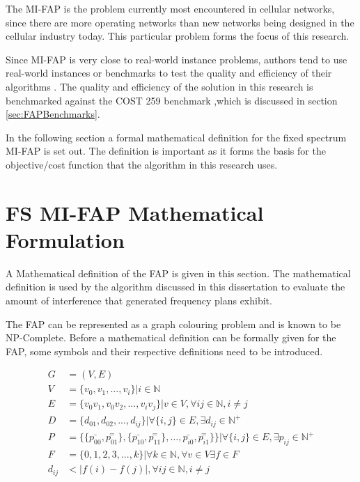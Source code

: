 The MI-FAP is the problem currently most encountered in cellular networks, since there are more operating networks than new networks being designed in the cellular industry today. This particular problem forms the focus of this research. 

Since MI-FAP is very close to real-world instance problems, authors tend to use real-world instances or benchmarks to test the quality and efficiency of their algorithms \cite{Eisenblatter,MontemanniThesis}. The quality and efficiency of the solution in this research is benchmarked against the COST 259 benchmark ,which is discussed in section \ref{sec:FAPBenchmarks}.

In the following section a formal mathematical definition for the fixed spectrum MI-FAP is set out. The definition is important as it forms the basis for the objective/cost function that the algorithm in this research uses.
 
\section{FS MI-FAP Mathematical Formulation}
\label{sec:FAPMathDef}
A Mathematical definition of the FAP is given in this section. The mathematical definition is used by the algorithm discussed in this dissertation to evaluate the amount of interference that generated frequency plans exhibit.

The FAP can be represented as a graph colouring problem and is known to be NP-Complete. Before a mathematical definition can be formally given for the FAP, some symbols and their respective definitions need to be introduced.

\begin{align}
	G &= (V,E) \label{E:setG}\\
	V &= \{v_{0},v_{1},...,v_{i}\} | i \in \mathbb{N} \label{E:setV}\\
	E &= \{v_0v_1,v_0v_2,...,v_iv_j\}|v \in V,\forall ij \in \mathbb{N},i \neq j \label{E:setE}\\
	D &= \{d_{01},d_{02},...,d_{ij}\}| \forall\{i,j\} \in E, \exists d_{ij} \in \mathbb{N}^+ \label{E:setD}\\
	P &= \{\{\bar{p_{00}},\overset{=}{p_{01}}\},\{\bar{p_{10}},\overset{=}{p_{11}}\},\ldots,\bar{p_{i0}},\overset{=}{p_{i1}}\}\}| \forall \{i,j\} \in E,\exists p_{ij} \in \mathbb{N}^+ \label{E:setP}\\
	F &= \{0,1,2,3,...,k\}| \forall k \in \mathbb{N},\forall v \in V \exists f \in F\label{E:setF}\\
	d_{ij} &< |f(i) - f(j)|, \forall ij \in \mathbb{N},i \neq j \label{E:interference}
\end{align}

